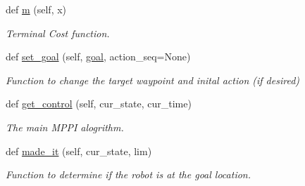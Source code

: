 \begin{DoxyCompactItemize}
def \hyperlink{classmppi__control_1_1mppi__lib_1_1mppi_a52f1aaeb68db93c409fad6ab39379384}{m} (self, x)
\begin{DoxyCompactList}\small\item\em Terminal Cost function. \end{DoxyCompactList}\item 
def \hyperlink{classmppi__control_1_1mppi__lib_1_1mppi_aa6c892f2527dff71e2627454e135fe81}{set\+\_\+goal} (self, \hyperlink{classmppi__control_1_1mppi__lib_1_1mppi_a68ee5156799bb07db88f240790c5cf5f}{goal}, action\+\_\+seq=None)
\begin{DoxyCompactList}\small\item\em Function to change the target waypoint and inital action (if desired) \end{DoxyCompactList}\item 
def \hyperlink{classmppi__control_1_1mppi__lib_1_1mppi_af8fd429f1aa4508069e7410987649100}{get\+\_\+control} (self, cur\+\_\+state, cur\+\_\+time)
\begin{DoxyCompactList}\small\item\em The main M\+P\+PI alogrithm. \end{DoxyCompactList}\item 
def \hyperlink{classmppi__control_1_1mppi__lib_1_1mppi_a2701aeac8683ceecbd4d86303f4c3647}{made\+\_\+it} (self, cur\+\_\+state, lim)
\begin{DoxyCompactList}\small\item\em Function to determine if the robot is at the goal location. \end{DoxyCompactList}\end{DoxyCompactItemize}
